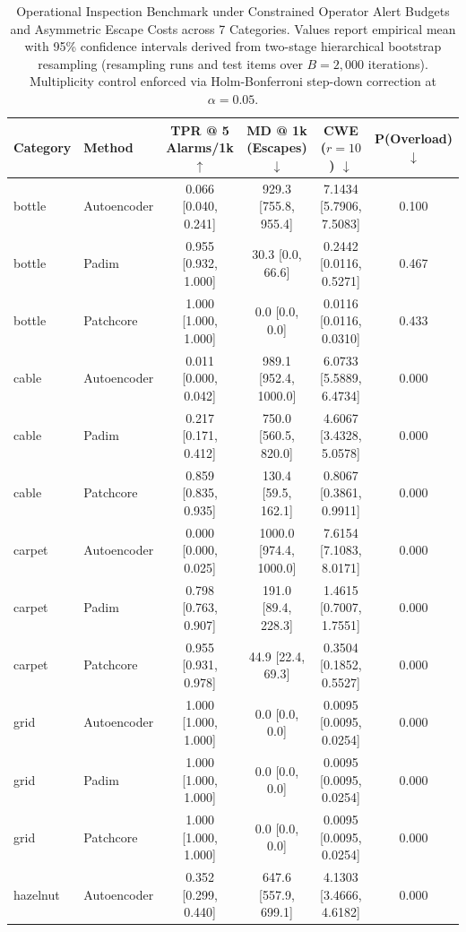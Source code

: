 \begin{table}[t]
\centering
\small
\caption{Operational Inspection Benchmark under Constrained Operator Alert Budgets and Asymmetric Escape Costs across 7 Categories. Values report empirical mean with 95\% confidence intervals derived from two-stage hierarchical bootstrap resampling (resampling runs and test items over $B = 2,000$ iterations). Multiplicity control enforced via Holm-Bonferroni step-down correction at $\alpha = 0.05$.}
\label{tab:operational_results}
\begin{tabular}{llcccc}
\toprule
\textbf{Category} & \textbf{Method} & \textbf{TPR @ 5 Alarms/1k} $\uparrow$ & \textbf{MD @ 1k (Escapes)} $\downarrow$ & \textbf{CWE ($r=10$)} $\downarrow$ & \textbf{P(Overload)} $\downarrow$ \\
\midrule
bottle & Autoencoder & 0.066 [0.040, 0.241] & 929.3 [755.8, 955.4] & 7.1434 [5.7906, 7.5083] & 0.100 \\
bottle & Padim & 0.955 [0.932, 1.000] & 30.3 [0.0, 66.6] & 0.2442 [0.0116, 0.5271] & 0.467 \\
bottle & Patchcore & 1.000 [1.000, 1.000] & 0.0 [0.0, 0.0] & 0.0116 [0.0116, 0.0310] & 0.433 \\
\midrule
cable & Autoencoder & 0.011 [0.000, 0.042] & 989.1 [952.4, 1000.0] & 6.0733 [5.5889, 6.4734] & 0.000 \\
cable & Padim & 0.217 [0.171, 0.412] & 750.0 [560.5, 820.0] & 4.6067 [3.4328, 5.0578] & 0.000 \\
cable & Patchcore & 0.859 [0.835, 0.935] & 130.4 [59.5, 162.1] & 0.8067 [0.3861, 0.9911] & 0.000 \\
\midrule
carpet & Autoencoder & 0.000 [0.000, 0.025] & 1000.0 [974.4, 1000.0] & 7.6154 [7.1083, 8.0171] & 0.000 \\
carpet & Padim & 0.798 [0.763, 0.907] & 191.0 [89.4, 228.3] & 1.4615 [0.7007, 1.7551] & 0.000 \\
carpet & Patchcore & 0.955 [0.931, 0.978] & 44.9 [22.4, 69.3] & 0.3504 [0.1852, 0.5527] & 0.000 \\
\midrule
grid & Autoencoder & 1.000 [1.000, 1.000] & 0.0 [0.0, 0.0] & 0.0095 [0.0095, 0.0254] & 0.000 \\
grid & Padim & 1.000 [1.000, 1.000] & 0.0 [0.0, 0.0] & 0.0095 [0.0095, 0.0254] & 0.000 \\
grid & Patchcore & 1.000 [1.000, 1.000] & 0.0 [0.0, 0.0] & 0.0095 [0.0095, 0.0254] & 0.000 \\
\midrule
hazelnut & Autoencoder & 0.352 [0.299, 0.440] & 647.6 [557.9, 699.1] & 4.1303 [3.4666, 4.6182] & 0.000 \\

\end{tabular}
\end{table}
